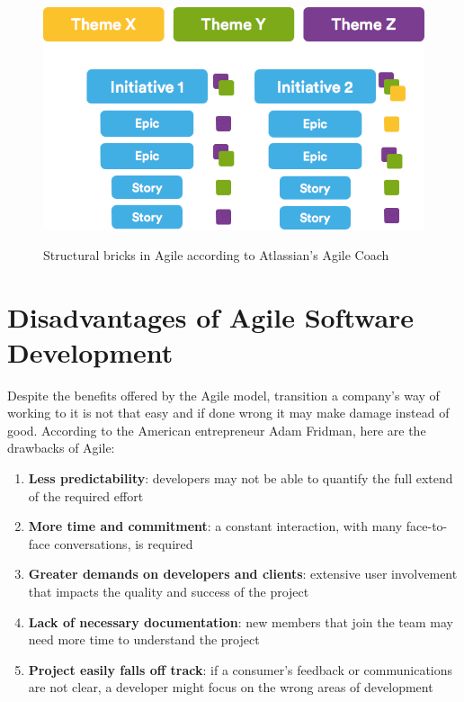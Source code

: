 	\begin{figure}[H]
		\centering
		\includegraphics[width=.8\textwidth]{resources/Themes}\\
		\caption{Structural bricks in Agile according to Atlassian's Agile Coach}
	\end{figure}

\section{Disadvantages of Agile Software Development}
	Despite the benefits offered by the Agile model, transition a company's way of working to it is not that easy and if done wrong it may make damage instead of good.
	According to the American entrepreneur Adam Fridman, here are the drawbacks\cite{massive-downside-of-agile} of Agile:
	\begin{enumerate}
		\item \textbf{Less predictability}: developers may not be able to quantify the full extend of the required effort
		\item \textbf{More time and commitment}: a constant interaction, with many face-to-face conversations, is required
		\item \textbf{Greater demands on developers and clients}: extensive user involvement that impacts the quality and success of the project
		\item \textbf{Lack of necessary documentation}: new members that join the team may need more time to understand the project
		\item \textbf{Project easily falls off track}: if a consumer's feedback or communications are not clear, a developer might focus on the wrong areas of development
	\end{enumerate}
	
